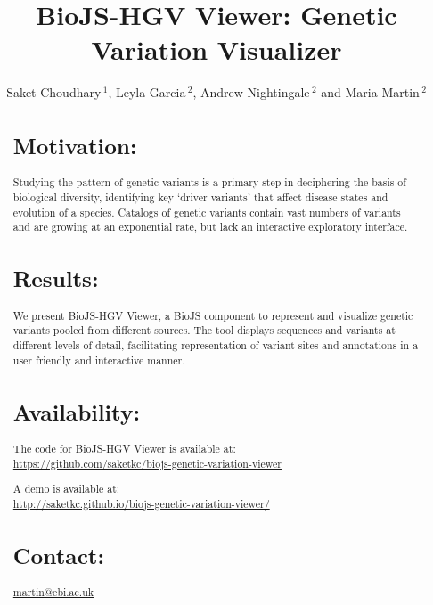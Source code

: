 \documentclass{bioinfo}
\begin{document}

\title[short Title]{BioJS-HGV Viewer: Genetic Variation Visualizer}
\author[Choudhary \textit{et~al}]{Saket Choudhary\,$^{1}$, Leyla Garcia\,$^{2}$, Andrew Nightingale\,$^{2}$ and Maria Martin\,$^{2}$}
\address{$^{1}$Molecular and Computational Biology, University of Southern California, Los Angeles, California, 90007, USA \\
$^{2}$European Molecular Biology laboratory - European Bioinformatics Institute (EMBL-EBI), Hinxton, Cambridge, CB10 1SD, UK}
\history{}%
\editor{}%
\maketitle

\begin{abstract}

\section{Motivation:}
Studying the pattern of genetic variants is a primary step in deciphering the basis of biological diversity, identifying key `driver variants' that affect disease states and evolution of a species. Catalogs of genetic variants contain vast numbers of variants and are growing at an exponential rate, but lack an interactive exploratory interface.




\section{Results:}
We present BioJS-HGV Viewer, a BioJS component to represent and visualize genetic variants pooled from different sources. The tool displays sequences and variants at different levels of detail, facilitating representation of variant sites and annotations in a user friendly and interactive manner. 


\section{Availability:}
The code for BioJS-HGV Viewer is available at:\\ \href{https://github.com/saketkc/biojs-genetic-variation-viewer}{https://github.com/saketkc/biojs-genetic-variation-viewer}

A demo is available at:\\ \footnotesize{\href{http://saketkc.github.io/biojs-genetic-variation-viewer/}{http://saketkc.github.io/biojs-genetic-variation-viewer/}}

\section{Contact:} \href{martin@ebi.ac.uk}{martin@ebi.ac.uk}
\end{abstract}
\end{document}

